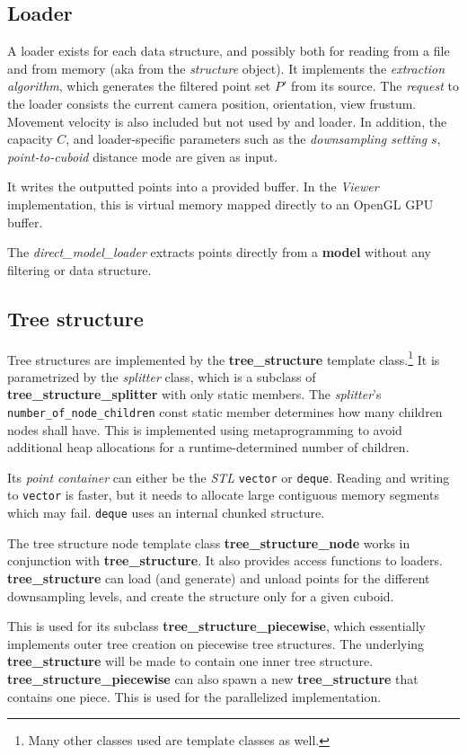 \documentclass[a4paper,10pt,abstracton,notitlepage]{scrreprt}
\begin{document}
\subsection{Loader}
A loader exists for each data structure, and possibly both for reading from a file and from memory (aka from the \emph{structure} object). It implements the \emph{extraction algorithm}, which generates the filtered point set $P'$ from its source. The \emph{request} to the loader consists the current camera position, orientation, view frustum. Movement velocity is also included but not used by and loader. In addition, the capacity $C$, and loader-specific parameters such as the \emph{downsampling setting} $s$, \emph{point-to-cuboid} distance mode are given as input.

It writes the outputted points into a provided buffer. In the \emph{Viewer} implementation, this is virtual memory mapped directly to an OpenGL GPU buffer.

The \emph{direct\_model\_loader} extracts points directly from a \textbf{model} without any filtering or data structure.


\subsection{Tree structure}
Tree structures are implemented by the \textbf{tree\_structure} template class.\footnote{Many other classes used are template classes as well.} It is parametrized by the \emph{splitter} class, which is a subclass of \textbf{tree\_structure\_splitter} with only static members. The \emph{splitter}'s \texttt{number\_of\_node\_children} const static member determines how many children nodes shall have. This is implemented using metaprogramming to avoid additional heap allocations for a runtime-determined number of children.

Its \emph{point container} can either be the \emph{STL} \texttt{vector} or \texttt{deque}. Reading and writing to \texttt{vector} is faster, but it needs to allocate large contiguous memory segments which may fail. \texttt{deque} uses an internal chunked structure.

The tree structure node template class \textbf{tree\_structure\_node} works in conjunction with \textbf{tree\_structure}. It also provides access functions to loaders. \textbf{tree\_structure} can load (and generate) and unload points for the different downsampling levels, and create the structure only for a given cuboid.

This is used for its subclass \textbf{tree\_structure\_piecewise}, which essentially implements outer tree creation on piecewise tree structures. The underlying \textbf{tree\_structure} will be made to contain one inner tree structure. \textbf{tree\_structure\_piecewise} can also spawn a new \textbf{tree\_structure} that contains one piece. This is used for the parallelized implementation.
\end{document}
